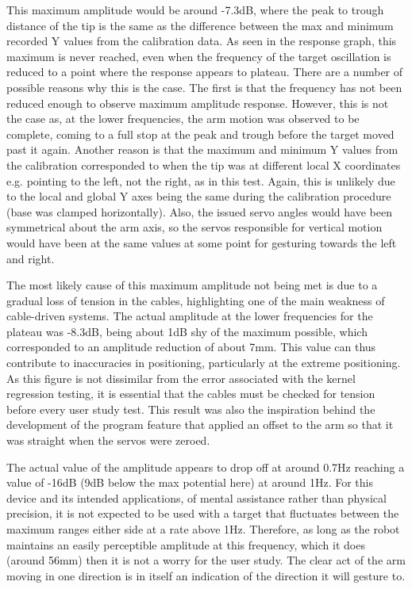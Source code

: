 \documentclass[11pt]{article}
\begin{document}
This maximum amplitude would be around -7.3dB, where the peak to trough distance of the tip is the same as the difference between the max and minimum recorded Y values from the calibration data. As seen in the response graph, this maximum is never reached, even when the frequency of the target oscillation is reduced to a point where the response appears to plateau. There are a number of possible reasons why this is the case. The first is that the frequency has not been reduced enough to observe maximum amplitude response. However, this is not the case as, at the lower frequencies, the arm motion was observed to be complete, coming to a full stop at the peak and trough before the target moved past it again. Another reason is that the maximum and minimum Y values from the calibration corresponded to when the tip was at different local X coordinates e.g. pointing to the left, not the right, as in this test. Again, this is unlikely due to the local and global Y axes being the same during the calibration procedure (base was clamped horizontally). Also, the issued servo angles would have been symmetrical about the arm axis, so the servos responsible for vertical motion would have been at the same values at some point for gesturing towards the left and right. 

The most likely cause of this maximum amplitude not being met is due to a gradual loss of tension in the cables, highlighting one of the main weakness of cable-driven systems. The actual amplitude at the lower frequencies for the plateau was -8.3dB, being about 1dB shy of the maximum possible, which corresponded to an amplitude reduction of about 7mm. This value can thus contribute to inaccuracies in positioning, particularly at the extreme positioning. As this figure is not dissimilar from the error associated with the kernel regression testing, it is essential that the cables must be checked for tension before every user study test. This result was also the inspiration behind the development of the program feature that applied an offset to the arm so that it was straight when the servos were zeroed.

The actual value of the amplitude appears to drop off at around 0.7Hz reaching a value of -16dB (9dB below the max potential here) at around 1Hz. For this device and its intended applications, of mental assistance rather than physical precision, it is not expected to be used with a target that fluctuates between the maximum ranges either side at a rate above 1Hz. Therefore, as long as the robot maintains an easily perceptible amplitude at this frequency, which it does (around 56mm) then it is not a worry for the user study. The clear act of the arm moving in one direction is in itself an indication of the direction it will gesture to.
\end{document}
